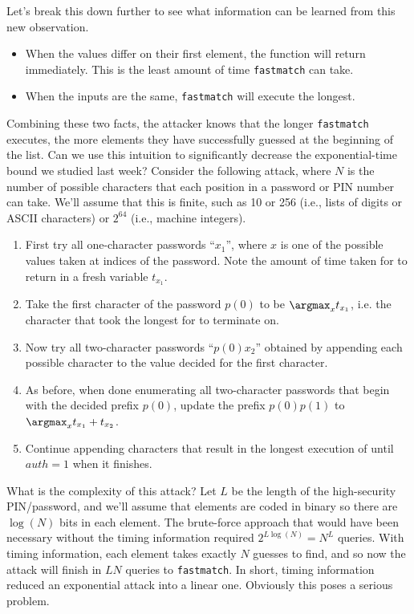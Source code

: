 \documentclass[11pt,twoside]{scrartcl}
\begin{document}
Let's break this down further to see what information can be learned from this new observation.
\begin{itemize}
\item When the values differ on their first element, the function will return immediately. This is the least amount of time \texttt{fastmatch} can take.
\item When the inputs are the same, \texttt{fastmatch} will execute the longest.
\end{itemize}
Combining these two facts, the attacker knows that the longer \texttt{fastmatch} executes, the more elements they have successfully guessed at the beginning of the list.
Can we use this intuition to significantly decrease the exponential-time bound we studied last week? Consider the following attack, where $N$ is the number of possible characters that each position in a password or PIN number can take. We'll assume that this is finite, such as 10 or 256 (i.e., lists of digits or ASCII characters) or $2^{64}$ (i.e., machine integers).
\begin{enumerate}
	\item First try all one-character passwords ``$x_1$'', where $x$ is one of the possible values taken at indices of the password. Note the amount of time taken for  to return in a fresh variable $t_{x_1}$.
	\item Take the first character of the password $p(0)$ to be $\argmax_x t_{x_1}$, i.e. the character that took the longest for  to terminate on.
	\item Now try all two-character passwords ``$p(0)x_2$'' obtained by appending each possible character to the value decided for the first character.
	\item As before, when done enumerating all two-character passwords that begin with the decided prefix $p(0)$, update the prefix $p(0)p(1)$ to $\argmax_x t_{x_1} + t_{x_2}$.
	\item Continue appending characters that result in the longest execution of  until $\mathit{auth} = 1$ when it finishes.
\end{enumerate}
What is the complexity of this attack? Let $L$ be the length of the high-security PIN/password, and we'll assume that elements are coded in binary so there are $\log(N)$ bits in each element. The brute-force approach that would have been necessary without the timing information required $2^{L\log(N)} = N^L$ queries. With timing information, each element takes exactly $N$ guesses to find, and so now the attack will finish in $LN$ queries to \texttt{fastmatch}. In short, timing information reduced an exponential attack into a linear one. Obviously this poses a serious problem.
\end{document}
